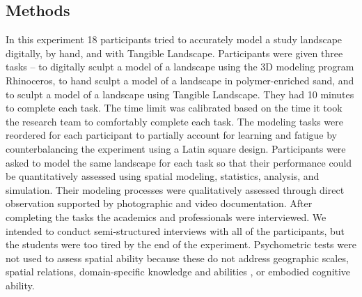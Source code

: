 \documentclass[Afour,sageh,times]{sagej}
\begin{document}
\subsection{Methods}
In this experiment 
18 participants tried to accurately model a study landscape 
digitally, by hand, and with Tangible Landscape. 
Participants were given three tasks -- 
to digitally sculpt a model of a landscape using the 3D modeling program Rhinoceros, 
to hand sculpt a model of a landscape in polymer-enriched sand,
and to sculpt a model of a landscape using Tangible Landscape.
They had 10 minutes to complete each task. 
The time limit was calibrated based on 
the time it took the research team 
to comfortably complete each task. 
The modeling tasks were reordered for each participant
to partially account for learning and fatigue
by counterbalancing the experiment using a Latin square design.
Participants were asked to model the same landscape for each task 
so that their performance could be quantitatively assessed 
using spatial modeling, statistics, analysis, and simulation.
Their modeling processes were qualitatively assessed 
through direct observation
supported by photographic and video documentation. 
After completing the tasks
the academics and professionals 
were interviewed. 
We intended to conduct semi-structured interviews 
with all of the participants, but
the students were too tired by the end of the experiment. 
Psychometric tests were not used
to assess spatial ability because
these do not address 
geographic scales,
spatial relations,
domain-specific knowledge and abilities 
\cite{Lee2009,Bednarz2011,Wakabayashi2011},
or embodied cognitive ability. 

\end{document}
